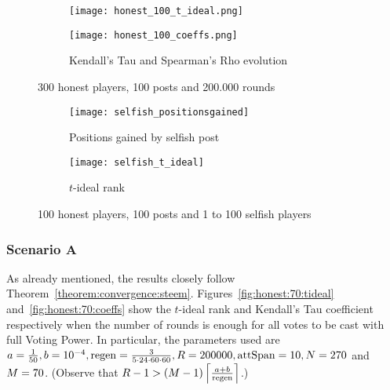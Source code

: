     \begin{figure}[h]
      \begin{subfigure}[t]{0.5\textwidth}
        \centering
        \texttt{[image: honest\_100\_t\_ideal.png]}
        \label{fig:honest:100:tideal}
      \end{subfigure}\hfill
      \begin{subfigure}[t]{0.5\textwidth}
        \centering
        \texttt{[image: honest\_100\_coeffs.png]}
        \caption{Kendall's Tau and Spearman's Rho evolution}
        \label{fig:honest:100:coeffs}
      \end{subfigure}
      \caption{300 honest players, 100 posts and 200.000 rounds}
    \end{figure}

    \begin{figure}[h]
      \begin{subfigure}[t]{0.5\textwidth}
        \centering
        \texttt{[image: selfish\_positionsgained]}
        \caption{Positions gained by selfish post}
        \label{fig:selfish:gain}
      \end{subfigure}\hfill
      \begin{subfigure}[t]{0.5\textwidth}
        \centering
        \texttt{[image: selfish\_t\_ideal]}
        \caption{$t$-ideal rank}
        \label{fig:selfish:tideal}
      \end{subfigure}
      \caption{100 honest players, 100 posts and 1 to 100 selfish players}
    \end{figure}

    \subsubsection*{Scenario A}
      As already mentioned, the results closely follow
      Theorem~\ref{theorem:convergence:steem}.
      Figures~\ref{fig:honest:70:tideal} and~\ref{fig:honest:70:coeffs} show the
      $t$-ideal rank and Kendall's Tau coefficient respectively when the number
      of rounds is enough for all votes to be cast with full Voting Power. In
      particular, the parameters used are $a = \frac{1}{50}, b = 10^{-4}, \regen
      = \frac{3}{5 \cdot 24 \cdot 60 \cdot 60}, \rounds = 200000, \attspan = 10,
      \playerlen = 270$ and $\postlen = 70$. (Observe that $\rounds - 1 >
      \left(\postlen - 1\right)\ceil*{\frac{a + b}{\regen}}$.)

